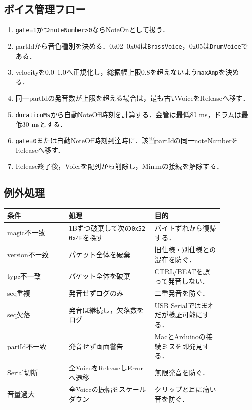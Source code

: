 \documentclass[a4paper,11pt]{jsarticle}
\begin{document}
\subsection{ボイス管理フロー}

\begin{enumerate}
\item \texttt{gate=1}かつ\texttt{noteNumber>0}ならNoteOnとして扱う．
\item partIdから音色種別を決める．0x02--0x04は\texttt{BrassVoice}，0x05は\texttt{DrumVoice}である．
\item velocityを0.0--1.0へ正規化し，総振幅上限0.8を超えないよう\texttt{maxAmp}を決める．
\item 同一partIdの発音数が上限を超える場合は，最も古いVoiceをReleaseへ移す．
\item \texttt{durationMs}から自動NoteOff時刻を計算する．金管は最低80 ms，ドラムは最低30 msとする．
\item \texttt{gate=0}または自動NoteOff時刻到達時に，該当partIdの同一noteNumberをReleaseへ移す．
\item Release終了後，Voiceを配列から削除し，Minimの接続を解除する．
\end{enumerate}

\subsection{例外処理}

\begin{longtable}{p{0.25\linewidth}p{0.35\linewidth}p{0.28\linewidth}}
\hline
条件 & 処理 & 目的 \\
\hline
\endhead
magic不一致 & 1Bずつ破棄して次の\texttt{0x52 0x4F}を探す & バイトずれから復帰する． \\
\hline
version不一致 & パケット全体を破棄 & 旧仕様・別仕様との混在を防ぐ． \\
\hline
type不一致 & パケット全体を破棄 & CTRL/BEATを誤って発音しない． \\
\hline
seq重複 & 発音せずログのみ & 二重発音を防ぐ． \\
\hline
seq欠落 & 発音は継続し，欠落数をログ & USB Serialではまれだが検証可能にする． \\
\hline
partId不一致 & 発音せず画面警告 & MacとArduinoの接続ミスを即発見する． \\
\hline
Serial切断 & 全VoiceをReleaseしErrorへ遷移 & 無限発音を防ぐ． \\
\hline
音量過大 & 全Voiceの振幅をスケールダウン & クリップと耳に痛い音を防ぐ． \\
\hline
\end{longtable}
\end{document}
